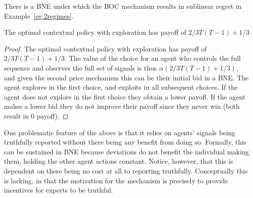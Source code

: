 \begin{prop}
There is a BNE under which the BOC mechanism results in sublinear regret in Example~\ref{eg:2regimes}. 
\end{prop}

The optimal contextual policy with exploration has payoff of $2/3T(T-1) + 1/3$

\begin{proof}
The optimal contextual policy with exploration has payoff of $2/3T(T-1) + 1/3$. The value of the choice for an agent who controls the full sequence and observes the full set of signals is thus $\alpha (2/3T(T-1) + 1/3)$, and given the second price mechanism this can be their initial bid in a BNE. The agent explores in the first choice, and exploits in all subsequent choices. If the agent does not explore in the first choice they obtain a lower payoff. If the agent makes a lower bid they do not improve their payoff since they never win (both result in 0 payoff).
\end{proof}


One problematic feature of the above is that it relies on agents' signals being truthfully reported without there being any benefit from doing so. Formally, this can be sustained in BNE because deviations do not benefit the individual making them, holding the other agent actions constant. Notice, however, that this is dependent on there being no cost at all to reporting truthfully.
Conceptually this is lacking, in that the motivation for the mechanism is precisely to provide incentives for experts to be truthful.










